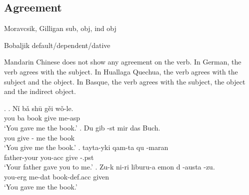 \subsection{Agreement}

Moravcsik, Gilligan sub, obj, ind obj

Bobaljik default/dependent/dative

Mandarin Chinese does not show any agreement on the verb. In German, the verb agrees with the subject. In Huallaga Quechua, the verb agrees with the subject and the object. In Basque, the verb agrees with the subject, the object and the indirect object.


\ex.
\ag. Nǐ bǎ shū gěi wǒ-le.\\
 you ba book give me-\ac{asp}\\
 `You gave me the book.' 
\bg. Du gib -st mir das Buch.\\
 you give - me the book\\
 `You give me the book.' 
\bg. tayta-yki qam-ta qu -maran\\
 father-your you-\ac{acc} give -.\ac{pst}\\
 `Your father gave you to me.' 
\bg. Zu-k ni-ri liburu-a emon d -austa -zu.\\
 you-\ac{erg} me-\ac{dat} book-\ac{def}.\ac{acc} given   \\
 `You gave me the book.' 

